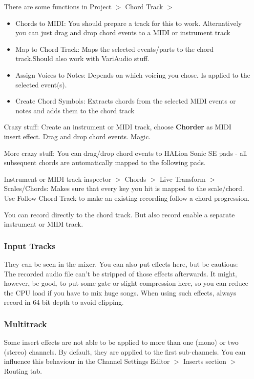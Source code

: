 \documentclass[10pt]{article}
\begin{document}
There are some functions in Project $>$ Chord Track $>$
\begin{itemize}
	\item Chords to MIDI: You should prepare a track for this to work. Alternatively you can just drag and drop chord events to a MIDI or instrument track
	\item Map to Chord Track: Maps the selected events/parts to the chord track.Should also work with VariAudio stuff.
	\item Assign Voices to Notes: Depends on which voicing you chose. Is applied to the selected event(s).
	\item Create Chord Symbols: Extracts chords from the selected MIDI events or notes and adds them to the chord track
\end{itemize}

Crazy stuff: Create an instrument or MIDI track, choose \textbf{Chorder} as MIDI insert effect. Drag and drop chord events. Magic.

More crazy stuff: You can drag/drop chord events to HALion Sonic SE pads - all subsequent chords are automatically mapped to the following pads.

Instrument or MIDI track inspector $>$ Chords $>$ Live Transform $>$ Scales/Chords: Makes sure that every key you hit is mapped to the scale/chord. Use Follow Chord Track to make an existing recording follow a chord progression.

You can record directly to the chord track. But also record enable a separate instrument or MIDI track.

\subsubsection{Input Tracks}

They can be seen in the mixer. You can also put effects here, but be cautious: The recorded audio file can't be stripped of those effects afterwards. It might, however, be good, to put some gate or slight compression here, so you can reduce the CPU load if you have to mix huge songs. When using such effects, always record in 64 bit depth to avoid clipping.

\subsubsection{Multitrack}

Some insert effects are not able to be applied to more than one (mono) or two (stereo) channels. By default, they are applied to the first sub-channels. You can influence this behaviour in the Channel Settings Editor $>$ Inserts section $>$ Routing tab.
\end{document}
